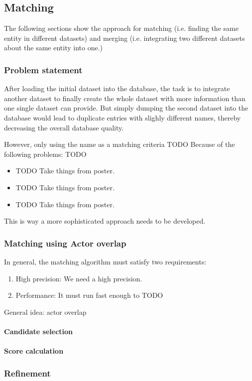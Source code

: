 \subsection{Matching}
\label{subsec_method_matching}

The following sections show the approach for matching (i.e. finding the same entity in different datasets) and merging (i.e. integrating two different datasets about the same entity into one.)

\subsubsection{Problem statement}
After loading the initial dataset into the database, the task is to integrate another dataset to finally create the whole dataset with more information than one single dataset can provide.
But simply dumping the second dataset into the database would lead to duplicate entries with slighly different names, thereby decreasing the overall database quality.

However, only using the name as a matching criteria TODO
Because of the following problems: TODO
\begin{itemize}
	\item TODO Take things from poster.
	\item TODO Take things from poster.
	\item TODO Take things from poster.
\end{itemize}
This is way a more sophisticated approach needs to be developed.

\subsubsection{Matching using Actor overlap}
In general, the matching algorithm must satisfy two requirements:
\begin{enumerate}
	\item{High precision}: We need a high precision.
	\item{Performance:} It must run fast enough to TODO
\end{enumerate}

General idea: actor overlap

\paragraph{Candidate selection}

\paragraph{Score calculation}

\subsubsection{Refinement}